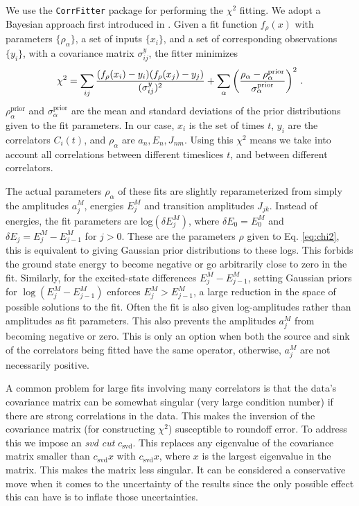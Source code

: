 We use the \texttt{CorrFitter} package \cite{CorrFitter} for performing the $\chi^2$ fitting. We adopt a Bayesian approach first introduced in \cite{Lepage:2001ym}. Given a fit function $f_{\rho}(x)$ with parameters $\{\rho_{\alpha}\}$, a set of inputs $\{x_i\}$, and a set of corresponding observations $\{y_i\}$, with a covariance matrix $\sigma^y_{ij}$, the fitter minimizes
\begin{align}
  \chi^2 = \sum_{ij} {( f_{\rho}(x_i) - y_i )( f_{\rho}(x_j) - y_j )\over (\sigma_{ij}^y)^2} + \sum_{\alpha}\left({\rho_{\alpha}-\rho^{\text{prior}}_{\alpha}\over\sigma_{\alpha}^{\text{prior}}}\right)^2\,.
  \label{eq:chi2}
\end{align}
$\rho_{\alpha}^{\text{prior}}$ and $\sigma_{\alpha}^{\text{prior}}$ are the mean and standard deviations of the prior distributions given to the fit parameters. In our case, $x_i$ is the set of times $t$, $y_i$ are the correlators $C_i(t)$, and $\rho_{\alpha}$ are $a_n,E_n,J_{nm}$. Using this $\chi^2$ means we take into account all correlations between different timeslices $t$, and between different correlators.

The actual parameters $\rho_{\alpha}$ of these fits are slightly reparameterized from simply the amplitudes $a_j^M$, energies $E_j^M$ and transition amplitudes $J_{jk}$. Instead of energies, the fit parameters are log$(\delta E_j^M)$, where $\delta E_0=E_0^M$ and $\delta E_j=E_j^M-E_{j-1}^M$ for $j>0$. These are the parameters $\rho$ given to Eq. \eqref{eq:chi2}, this is equivalent to giving Gaussian prior distributions to these logs. This forbids the ground state energy to become negative or go arbitrarily close to zero in the fit. Similarly, for the excited-state differences $E_j^M-E_{j-1}^M$, setting Gaussian priors for $\log(E_j^M-E^M_{j-1})$ enforces $E_j^M > E_{j-1}^M$, a large reduction in the space of possible solutions to the fit. Often the fit is also given log-amplitudes rather than amplitudes as fit parameters. This also prevents the amplitudes $a_j^M$ from becoming negative or zero. This is only an option when both the source and sink of the correlators being fitted have the same operator, otherwise, $a_j^M$ are not necessarily positive.

A common problem for large fits involving many correlators is that the data’s covariance matrix can be somewhat singular (very large condition number) if there are strong correlations in the data. This makes the inversion of the covariance matrix (for constructing $\chi^2$) susceptible to roundoff error. To address this we impose an {\it{svd cut}} $c_{\text{svd}}$. This replaces any eigenvalue of the covariance matrix smaller than $c_{\text{svd}} x$ with $c_{\text{svd}}x$, where $x$ is the largest eigenvalue in the matrix. This makes the matrix less singular. It can be considered a conservative move when it comes to the uncertainty of the results since the only possible effect this can have is to inflate those uncertainties.

